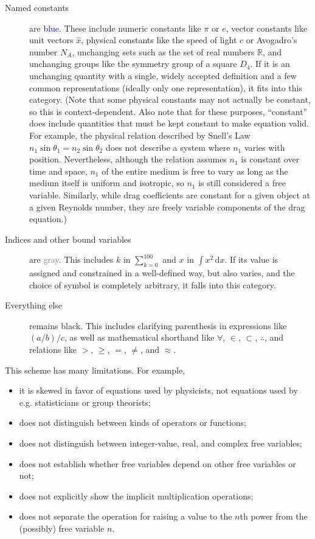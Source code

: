 \documentclass[12pt,letterpaper]{article}
\begin{document}
\begin{description}
\item[Named constants] are \textcolor{blue}{blue}.
      These include numeric constants like $\pi$ or $e$,
      vector constants like unit vectors $\hat{x}$, 
      physical constants like the speed of light $c$ or Avogadro's number $N_A$,
      unchanging sets such as the set of real numbers $\mathbb{R}$,
      and unchanging groups like the symmetry group of a square $D_4$. 
      If it is an unchanging quantity with a single,
      widely accepted definition and a few common representations (ideally only one representation),
      it fits into this category.
      (Note that some physical constants may not actually be constant,
      so this is context-dependent.
      Also note that for these purposes,
      ``constant'' does include quantities that must be kept constant to make equation valid.
      For example,
      the physical relation described by Snell's Law
      $n_1 \sin \theta_1 = n_2 \sin \theta_2$
      does not describe a system where $n_1$ varies with position.
      Nevertheless,
      although the relation assumes $n_1$ is constant over time and space,
      $n_1$ of the entire medium is free to vary as long as the medium itself is uniform and isotropic,
      so $n_1$ is still considered a free variable.
      Similarly,
      while drag coefficients are constant for a given object at a given Reynolds number,
      they are freely variable components of the drag equation.)      
\item[Indices and other bound variables] are \textcolor{Gray}{gray}. This includes $k$ in $\sum_{k = 0}^{100}$ and $x$ in $\int \! x^2 \, \mathrm{d}x$.
      If its value is assigned and constrained in a well-defined way,
      but also varies,
      and the choice of symbol is completely arbitrary,
      it falls into this category.
\item[Everything else] remains black.
      This includes clarifying parenthesis in expressions like $(a/b)/c$, as well as mathematical shorthand like $\forall$, $\in$, $\subset$, $\therefore$, and relations like $>$, $\geq$, $=$, $\neq$, and $\approx$.
\end{description}

This scheme has many limitations.
For example,
\begin{itemize}
\item it is skewed in favor of equations used by physicists,
not equations used by e.g. statisticians or group theorists;
\item does not distinguish between kinds of operators or functions;
\item does not distinguish between integer-value, real, and complex free variables;
\item does not establish whether free variables depend on other free variables or not;
\item does not explicitly show the implicit multiplication operations;
\item does not separate the operation for raising a value to the $n$th power from the (possibly) free variable $n$.
\end{itemize}
\end{document}
